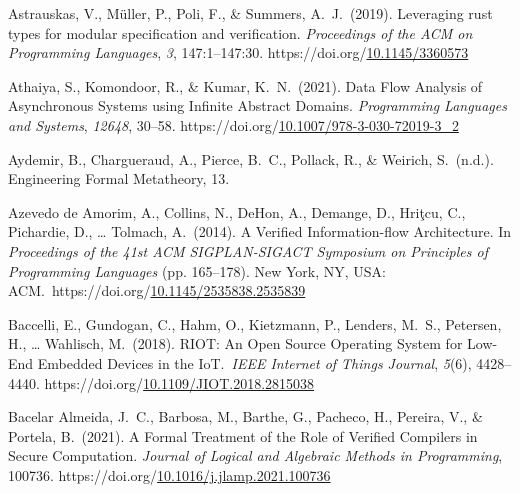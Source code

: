 \documentclass[12pt,twoside]{article}
\begin{document}
{\begin{thebibliography}{1079}
\mdbibitemlabel{}Astrauskas, V., Müller, P., Poli, F., \& Summers, A.~J.~(2019). Leveraging rust types for modular specification and verification. \emph{Proceedings of the ACM on Programming Languages}, \emph{3}, 147:1–147:30. https://doi.org/\href{https://dx.doi.org/10.1145/3360573}{10.1145/3360573}%

\mdbibitemlabel{}Athaiya, S., Komondoor, R., \& Kumar, K.~N.~(2021). Data Flow Analysis of Asynchronous Systems using Infinite Abstract Domains. \emph{Programming Languages and Systems}, \emph{12648}, 30–58. https://doi.org/\href{https://dx.doi.org/10.1007/978-3-030-72019-3_2}{10.1007/978-3-030-72019-3\_2}%

\mdbibitemlabel{}Aydemir, B., Chargueraud, A., Pierce, B.~C., Pollack, R., \& Weirich, S.~(n.d.). Engineering Formal Metatheory, 13.%

\mdbibitemlabel{}Azevedo de Amorim, A., Collins, N., DeHon, A., Demange, D., Hriţcu, C., Pichardie, D., … Tolmach, A.~(2014). A Verified Information-flow Architecture. In \emph{Proceedings of the 41st ACM SIGPLAN-SIGACT Symposium on Principles of Programming Languages} (pp. 165–178). New York, NY, USA: ACM.~https://doi.org/\href{https://dx.doi.org/10.1145/2535838.2535839}{10.1145/2535838.2535839}%

\mdbibitemlabel{}Baccelli, E., Gundogan, C., Hahm, O., Kietzmann, P., Lenders, M.~S., Petersen, H., … Wahlisch, M.~(2018). RIOT: An Open Source Operating System for Low-End Embedded Devices in the IoT.~\emph{IEEE Internet of Things Journal}, \emph{5}(6), 4428–4440. https://doi.org/\href{https://dx.doi.org/10.1109/JIOT.2018.2815038}{10.1109/JIOT.2018.2815038}%

\mdbibitemlabel{}Bacelar Almeida, J.~C., Barbosa, M., Barthe, G., Pacheco, H., Pereira, V., \& Portela, B.~(2021). A Formal Treatment of the Role of Verified Compilers in Secure Computation. \emph{Journal of Logical and Algebraic Methods in Programming}, 100736. https://doi.org/\href{https://dx.doi.org/10.1016/j.jlamp.2021.100736}{10.1016/j.jlamp.2021.100736}%


\end{thebibliography}}
\end{document}
